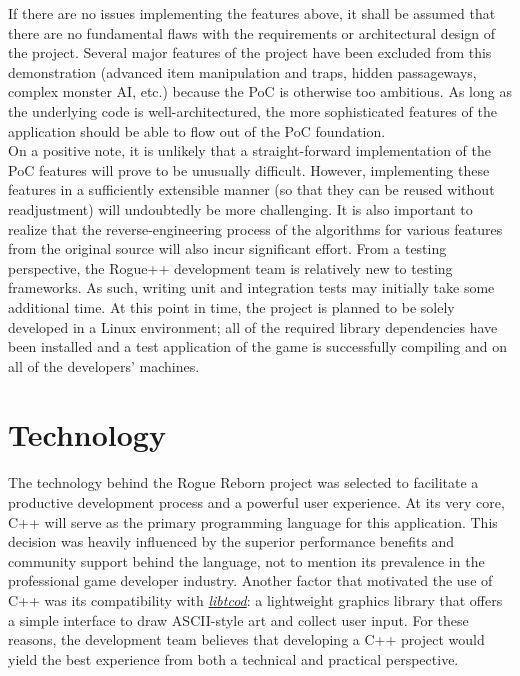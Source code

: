 \documentclass{article}
\begin{document}
If there are no issues implementing the features above, it shall be assumed that there are no fundamental flaws with the requirements or architectural design of the project.  Several major features of the project have been excluded from this demonstration (advanced item manipulation and traps, hidden passageways, complex monster AI, etc.) because the PoC is otherwise too ambitious.  As long as the underlying code is well-architectured, the more sophisticated features of the application should be able to flow out of the PoC foundation.\\	

On a positive note, it is unlikely that a straight-forward implementation of the PoC features will prove to be unusually difficult.  However, implementing these features in a sufficiently extensible manner (so that they can be reused without readjustment) will undoubtedly be more challenging.  It is also important to realize that the reverse-engineering process of the algorithms for various features from the original source will also incur significant effort.  From a testing perspective, the Rogue++ development team is relatively new to testing frameworks.  As such, writing unit and integration tests may initially take some additional time.  At this point in time, the project is planned to be solely developed in a Linux environment; all of the required library dependencies have been installed and a test application of the game is successfully compiling and on all of the developers' machines.

\section{Technology}
\label{tech_label}

\indent
The technology behind the Rogue Reborn project was selected to facilitate a productive development process and a powerful user experience. At its very core, C++ will serve as the primary programming language for this application.  This decision was heavily influenced by the superior performance benefits and community support behind the language, not to mention its prevalence in the professional game developer industry.  Another factor that motivated the use of C++ was its compatibility with \href{http://roguecentral.org/doryen/libtcod/}{\textit{libtcod}}: a lightweight graphics library that offers a simple interface to draw ASCII-style art and collect user input.  For these reasons, the development team believes that developing a C++ project would yield the best experience from both a technical and practical perspective.\\
\end{document}
